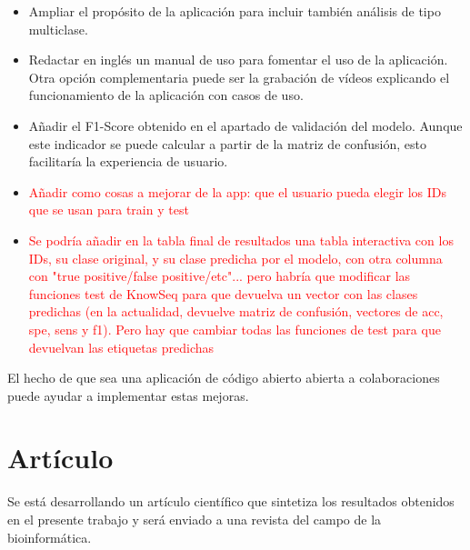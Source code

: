 \begin{itemize}
	\item Ampliar el propósito de la aplicación para incluir también análisis de tipo multiclase. 
	\item Redactar en inglés un manual de uso para fomentar el uso de la aplicación. Otra opción complementaria puede ser la grabación de vídeos explicando el funcionamiento de la aplicación con casos de uso.
	\item Añadir el F1-Score obtenido en el apartado de validación del modelo. Aunque este indicador se puede calcular a partir de la matriz de confusión, esto facilitaría la experiencia de usuario.
	\item \textcolor{red}{Añadir como cosas a mejorar de la app: que el usuario pueda elegir los IDs que se usan para train y test}
	\item\textcolor{red}{Se podría añadir en la tabla final de resultados una tabla interactiva con los IDs, su clase original, y su clase predicha por el modelo, con otra columna con "true positive/false positive/etc"... pero habría que modificar las funciones test de KnowSeq para que devuelva un vector con las clases predichas (en la actualidad, devuelve matriz de confusión, vectores de acc, spe, sens y f1). Pero hay que cambiar todas las funciones de test para que devuelvan las etiquetas predichas}
\end{itemize}

El hecho de que sea una aplicación de código abierto abierta a colaboraciones puede ayudar a implementar estas mejoras.

\section{Artículo}

Se está desarrollando un artículo científico que sintetiza los resultados obtenidos en el presente trabajo y será enviado a una revista del campo de la bioinformática.